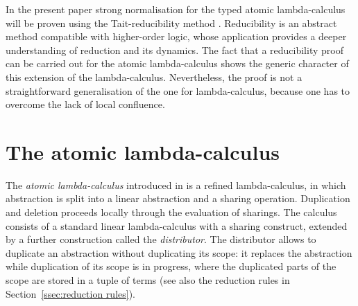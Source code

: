 \documentclass[orivec]{llncs}
\begin{document}
In the present paper strong normalisation for the typed atomic lambda-calculus will be proven using the Tait-reducibility method \cite{Tait-1967,ProofsAndTypes}.
%
Reducibility is an abstract method compatible with higher-order logic, whose application provides a deeper understanding of reduction and its dynamics.
%
%
%
The fact that a reducibility proof can be carried out for the atomic lambda-calculus shows the generic character of this extension
of the lambda-calculus.
%
Nevertheless, the proof is not a straightforward generalisation of the one for lambda-calculus, because one has to overcome
the lack of local confluence.
%
%



%

%
%


\section{The atomic lambda-calculus}
\label{sec:atomic-lambda-calculus}



The \emph{atomic lambda-calculus} introduced in \cite{Gundersen-Heijltjes-Parigot-2013-LICS} is a refined lambda-calculus, in which abstraction is split into a linear abstraction and a sharing operation.
%
Duplication and deletion proceeds locally through the evaluation of sharings.
%
The calculus consists of a standard linear lambda-calculus with a sharing construct, extended by a further construction called the \emph{distributor}.
%
The distributor allows to duplicate an abstraction without duplicating its scope: it replaces the abstraction while duplication of its scope is in progress, where the duplicated parts of the scope are stored in a tuple of terms (see also the reduction rules in Section~\ref{ssec:reduction rules}).
\end{document}
